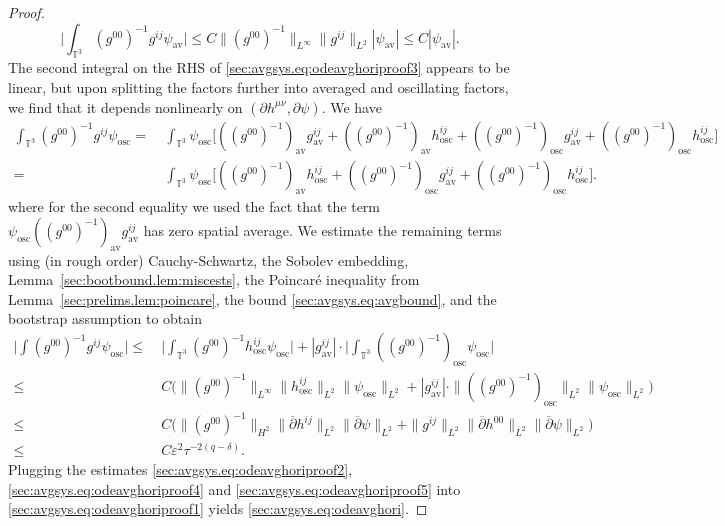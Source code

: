 \documentclass{article}
\newcommand{\TT}{\mathbb{T}}
\newcommand{\osc}{\mathrm{osc}}
\newcommand{\av}{\mathrm{av}}
\newcommand{\ol}{\overline}
\newcommand{\ve}{\varepsilon}
\newcommand{\pa}{\partial}
\begin{document}
\begin{proof}
    \begin{equation}\label{sec:avgsys.eq:odeavghoriproof4}
        \Big|\int_{\TT^3}(g^{00})^{-1}g^{ij} \psi_{\av}\Big| \leq C\|(g^{00})^{-1}\|_{L^\infty}\|g^{ij}\|_{L^2}|\psi_{\av}| \leq C|\psi_{\av}|.
    \end{equation}
    The second integral on the RHS of \eqref{sec:avgsys.eq:odeavghoriproof3} appears to be linear, but upon splitting the factors further into averaged and oscillating factors, we find that it depends nonlinearly on $(\pa h^{\mu\nu},\pa \psi)$. We have
    \begin{align}
        \int_{\TT^3}(g^{00})^{-1} g^{ij}\psi_{\osc} 
        =&\>\int_{\TT^3}\psi_{\osc}\Big[((g^{00})^{-1})_{\av} g_{\av}^{ij} + ((g^{00})^{-1})_{\av} h_{\osc}^{ij} + ((g^{00})^{-1})_{\osc} g_{\av}^{ij} + ((g^{00})^{-1})_{\osc} h_{\osc}^{ij}\Big]\nonumber\\
        =&\>\int_{\TT^3}\psi_{\osc}\Big[((g^{00})^{-1})_{\av} h_{\osc}^{ij} + ((g^{00})^{-1})_{\osc} g_{\av}^{ij} + ((g^{00})^{-1})_{\osc} h_{\osc}^{ij}\Big].
    \end{align}
    where for the second equality we used the fact that the term $\psi_{\osc}((g^{00})^{-1})_{\av} g_{\av}^{ij}$ has zero spatial average. We estimate the remaining terms using (in rough order) Cauchy-Schwartz, the Sobolev embedding, Lemma~\ref{sec:bootbound.lem:miscests}, the Poincar\'e inequality from Lemma~\ref{sec:prelims.lem:poincare}, the bound \eqref{sec:avgsys.eq:avgbound}, and the bootstrap assumption to obtain
    \begin{align}
        \Big|\int(g^{00})^{-1}g^{ij}\psi_\osc\Big| \leq&\> \Big|\int_{\TT^3}(g^{00})^{-1}h_{\osc}^{ij} \psi_{\osc}\Big| + |g_{\av}^{ij}|\cdot\Big|\int_{\TT^3}((g^{00})^{-1})_{\osc}\psi_{\osc}\Big|\nonumber\\
        \leq &\> C\big(\|(g^{00})^{-1}\|_{L^\infty}\|h_{\osc}^{ij}\|_{L^2}\|\psi_{\osc}\|_{L^2} + |g_{\av}^{ij}|\cdot\|((g^{00})^{-1})_{\osc}\|_{L^2}\|\psi_{\osc}\|_{L^2}\big)\nonumber\\
        \leq &\>C\big(\|(g^{00})^{-1}\|_{H^2}\|\ol{\pa}h^{ij}\|_{L^2}\|\ol{\pa}\psi\|_{L^2} + \|g^{ij}\|_{L^2}\|\ol{\pa}h^{00}\|_{L^2}\|\ol{\pa}\psi\|_{L^2}\big)\nonumber\\
        \leq&\> C\ve^2 \tau^{-2(q-\delta)}\label{sec:avgsys.eq:odeavghoriproof5}.
    \end{align}
    Plugging the estimates \eqref{sec:avgsys.eq:odeavghoriproof2}, \eqref{sec:avgsys.eq:odeavghoriproof4} and \eqref{sec:avgsys.eq:odeavghoriproof5} into \eqref{sec:avgsys.eq:odeavghoriproof1} yields \eqref{sec:avgsys.eq:odeavghori}.
\end{proof}
\end{document}
